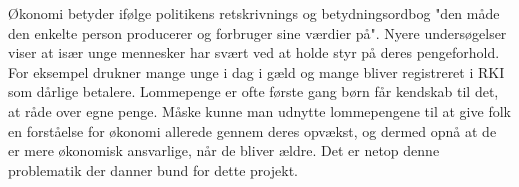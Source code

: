 Økonomi betyder ifølge politikens retskrivnings og betydningsordbog "den måde den enkelte person producerer og forbruger sine værdier på". Nyere undersøgelser viser at især unge mennesker har svært ved at holde styr på deres pengeforhold. For eksempel drukner mange unge i dag i gæld og mange bliver registreret i RKI som dårlige betalere.
Lommepenge er ofte første gang børn får kendskab til det, at råde over egne penge. Måske kunne man udnytte lommepengene til at give folk en forståelse for økonomi allerede gennem deres opvækst, og dermed opnå at de er mere økonomisk ansvarlige, 
når de bliver ældre. Det er netop denne problematik der danner bund for dette projekt.
